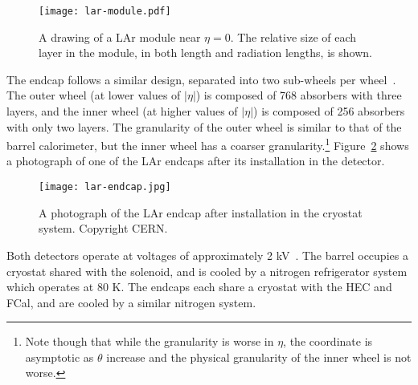 
\begin{figure}
\centering
\texttt{[image: lar-module.pdf]}
\label{fig:detector:lar-module}
\caption{A drawing of a LAr module near $\eta = 0$. The relative size of each layer in the module, in both length and radiation lengths, is shown.}
\end{figure}




The endcap follows a similar design, separated into two sub-wheels per wheel~\cite{ATLASPaper}. The outer wheel (at lower values of $|\eta|$) is composed of 768 absorbers with three layers, and the inner wheel (at higher values of $|\eta|$) is composed of 256 absorbers with only two layers. The granularity of the outer wheel is similar to that of the barrel calorimeter, but the inner wheel has a coarser granularity.\footnote{Note though that while the granularity is worse in $\eta$, the coordinate is asymptotic as $\theta$ increase and the physical granularity of the inner wheel is not worse.} Figure~\ref{fig:detector:lar-endcap} shows a photograph of one of the LAr endcaps after its installation in the detector.



\begin{figure}
\centering
\texttt{[image: lar-endcap.jpg]}
\label{fig:detector:lar-endcap}
\caption{A photograph of the LAr endcap after installation in the cryostat system. Copyright CERN.}
\end{figure}


Both detectors operate at voltages of approximately 2 kV~\cite{ATLASPaper}. The barrel occupies a cryostat shared with the solenoid, and is cooled by a nitrogen refrigerator system which operates at 80 K. The endcaps each share a cryostat with the HEC and FCal, and are cooled by a similar nitrogen system.

